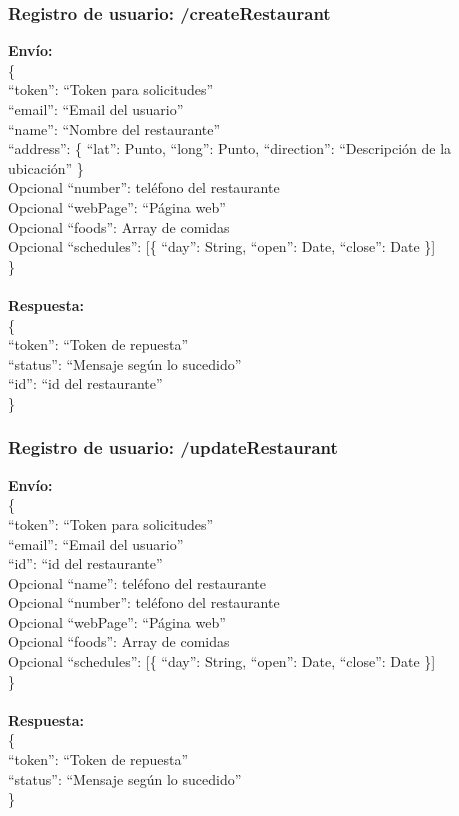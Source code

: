 \documentclass[12pt,letterpaper]{article}
\begin{document}
\subsubsection{Registro de usuario: /createRestaurant}
\noindent
\textbf{Envío: }\\
\noindent
\{ \\
``token'': ``Token para solicitudes'' \\
``email'': ``Email del usuario'' \\
``name'': ``Nombre del restaurante'' \\
``address'': \{ ``lat'': Punto, ``long'': Punto, ``direction'': ``Descripción de la ubicación'' \} \\
Opcional ``number'': teléfono del restaurante \\
Opcional ``webPage'': ``Página web'' \\
Opcional ``foods'': Array de comidas \\
Opcional ``schedules'': [\{ ``day'': String, ``open'': Date, ``close'': Date \}] \\
\} \\ \\
\noindent
\textbf{Respuesta: }\\
\noindent
\{ \\
``token'': ``Token de repuesta'' \\
``status'': ``Mensaje según lo sucedido'' \\
``id'': ``id del restaurante''\\
\}

\subsubsection{Registro de usuario: /updateRestaurant}
\noindent
\textbf{Envío: }\\
\noindent
\{ \\
``token'': ``Token para solicitudes'' \\
``email'': ``Email del usuario'' \\
``id'': ``id del restaurante''\\
Opcional ``name'': teléfono del restaurante \\
Opcional ``number'': teléfono del restaurante \\
Opcional ``webPage'': ``Página web'' \\
Opcional ``foods'': Array de comidas \\
Opcional ``schedules'': [\{ ``day'': String, ``open'': Date, ``close'': Date \}] \\
\} \\ \\
\noindent
\textbf{Respuesta: }\\
\noindent
\{ \\
``token'': ``Token de repuesta'' \\
``status'': ``Mensaje según lo sucedido'' \\
\}
\end{document}
